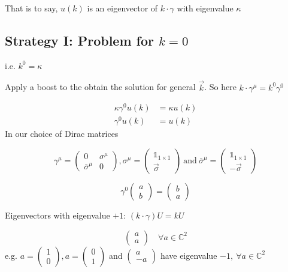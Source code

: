 \documentclass[11pt]{article}
\begin{document}
	That is to say, $u(k)$ is an eigenvector of $k\cdot\gamma$ with eigenvalue $\kappa$
	
	\subsection*{Strategy I: Problem for $k=0$}
	i.e. $k^0 = \kappa$
	
	Apply a boost to the obtain the solution for general $\vec{k}$. So here $k\cdot \gamma^\mu = k^0\gamma^0$
	
	\begin{align*}
		\kappa \gamma^0 u(k) &= \kappa u(k)\\
		\gamma^0 u(k) &= u(k)
	\end{align*}
	In our choice of Dirac matrices
	
	\[ \gamma^\mu = \begin{pmatrix}
		0 & \sigma^\mu \\
		\bar{\sigma}^\mu & 0
	\end{pmatrix}, \sigma^\mu = \begin{pmatrix}
	\mathbb{1}_{1\times 1} \\
			\vec{\sigma}
\end{pmatrix}\ 
		\text{and}\ \bar{\sigma}^\mu = \begin{pmatrix}
		\mathbb{1}_{1\times1}\\ -\vec{\sigma}
\end{pmatrix}\]
	
	\[ \gamma^0 \begin{pmatrix}
		a \\ b
	\end{pmatrix} = \begin{pmatrix}
	b \\ a
\end{pmatrix}\]
	
	Eigenvectors with eigenvalue $+1$: $(k\cdot \gamma)U = kU$
	
\[\begin{pmatrix}
		a \\ a
	\end{pmatrix} \quad \forall a\in \mathbb{C}^2
\]
e.g. $a= \begin{pmatrix}
	1 \\ 0
\end{pmatrix}, a= \begin{pmatrix}
0\\ 1
\end{pmatrix}$ and $\begin{pmatrix}
	a \\ -a 
\end{pmatrix}$ have eigenvalue $-1,\ \forall a\in\mathbb{C}^2$\\
\end{document}
